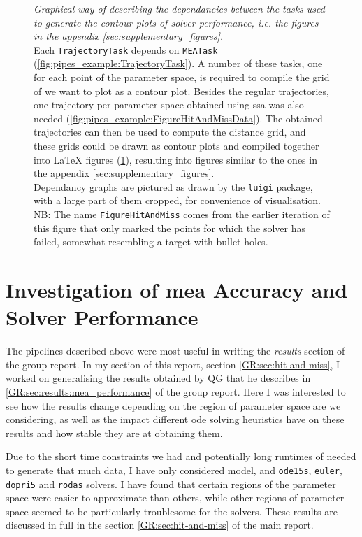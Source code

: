 \begin{figure}
\begin{subfigure}[t]{\textwidth}
        \label{fig:pipes_example:FigureHitAndMissTex}
    \end{subfigure}
    \caption{\emph{Graphical way of describing the dependancies between the tasks used to generate the contour plots of solver performance, i.e. the figures in the appendix \autoref{sec:supplementary_figures}.}\\ 
    Each  \texttt{TrajectoryTask} depends on \texttt{MEATask} (\ref{fig:pipes_example:TrajectoryTask}).
    A number of these tasks, one for each point of the parameter space, is required to compile the grid of we want to plot as a contour plot.
    Besides the regular trajectories, one trajectory per parameter space obtained using \acrlong{ssa} was also needed (\ref{fig:pipes_example:FigureHitAndMissData}).
    The obtained trajectories can then be used to compute the distance grid, and these grids could be drawn as contour plots and compiled together into \LaTeX{} figures (\ref{fig:pipes_example:FigureHitAndMissTex}), resulting into figures similar to the ones in the appendix \autoref{sec:supplementary_figures}.\\
    Dependancy graphs are pictured as drawn by the {\tt luigi} package, with a large part of them cropped, for convenience of visualisation.\\
    NB: The name {\tt FigureHitAndMiss} comes from the earlier iteration of this figure that only marked the points for which the solver has failed, somewhat resembling a target with bullet holes.}
    \label{fig:pipes_example}
\end{figure}

\section{Investigation of \acrshort{mea} Accuracy and Solver Performance}

The pipelines described above were most useful in writing the \emph{results} section of the group report. In my section of this report, section \autoref{GR:sec:hit-and-miss}, I worked on generalising the results obtained by QG that he describes in \autoref{GR:sec:results:mea_performance} of the group report. 
Here I was interested to see how the results change depending on the region of parameter space are we considering, as well as the impact different \gls{ode} solving heuristics have on these results and how stable they are at obtaining them.

Due to the short time constraints we had and potentially long runtimes of needed to generate that much data, I have only considered \pft{} model, and \texttt{ode15s}, \texttt{euler}, \texttt{dopri5} and \texttt{rodas} solvers. 
I have found that certain regions of the parameter space were easier to approximate than others, while other regions of parameter space seemed to be particularly troublesome for the solvers. 
These results are discussed in full in the section \autoref*{GR:sec:hit-and-miss} of the main report.

